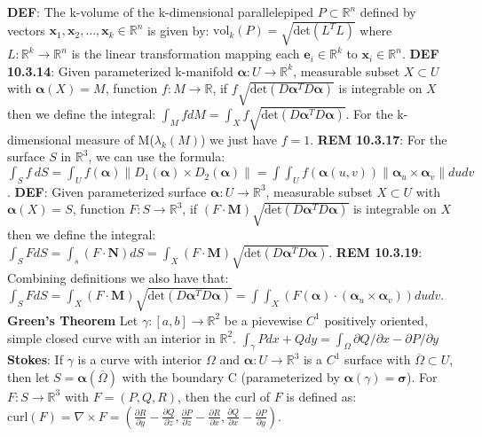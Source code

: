 \documentclass[8pt]{extarticle}
\theoremstyle{definition}
\begin{document}
\textbf{DEF}: The k-volume of the k-dimensional parallelepiped $P \subset \mathbb{R}^n$ defined by vectors $\textbf{x}_1, \textbf{x}_2, \dots, \textbf{x}_k \in \mathbb{R}^n$ is given by: $\text{vol}_k(P) = \sqrt{\text{det}(L^T L)}$ where $L:\mathbb{R}^k \rightarrow \mathbb{R}^n$ is the linear transformation mapping each $\textbf{e}_i \in \mathbb{R}^k$ to $\textbf{x}_i \in \mathbb{R}^n$. 
\textbf{DEF 10.3.14}: Given parameterized k-manifold $\bm{\alpha}: U \rightarrow \mathbb{R}^k$, measurable subset $X \subset U$ with $\bm{\alpha}(X) = M$, function $f: M \rightarrow \mathbb{R}$, if $f\sqrt{\text{det}(D \bm{\alpha}^{T} D \bm{\alpha})}$ is integrable on $X$ then we define the integral: $\int_M f dM = \int_X f\sqrt{\text{det}(D \bm{\alpha}^{T} D \bm{\alpha})}$. For the k-dimensional measure of M($\lambda_k(M)$) we just have $f = 1$. 
\textbf{REM 10.3.17}: For the surface $S$ in $\mathbb{R}^3$, we can use the formula: $\int_S f~dS = \int_U f(\bm{\alpha}) \| D_1(\bm{\alpha}) \times D_2(\bm{\alpha}) \| = \int \int_U f(\bm{\alpha}(u,v)) \| \bm{\alpha}_u \times \bm{\alpha}_v \| dudv$. 
\textbf{DEF}: Given parameterized surface $\bm{\alpha}: U \rightarrow \mathbb{R}^3$, measurable subset $X \subset U$ with $\bm{\alpha}(X) = S$, function $F: S \rightarrow \mathbb{R}^3$, if $(F\cdot \textbf{M})\sqrt{\text{det}(D \bm{\alpha}^{T} D \bm{\alpha})}$ is integrable on $X$ then we define the integral: $\int_S F dS = \int_s (F \cdot \textbf{N}) dS = \int_X (F\cdot \textbf{M})\sqrt{\text{det}(D \bm{\alpha}^{T} D \bm{\alpha})}$. 
\textbf{REM 10.3.19}: Combining definitions we also have that: $\int_S F dS = \int_X (F\cdot \textbf{M})\sqrt{\text{det}(D \bm{\alpha}^{T} D \bm{\alpha})} = \int \int_X (F(\bm{\alpha}) \cdot (\bm{\alpha}_u \times \bm{\alpha}_v)) dudv$. 
\textbf{Green's Theorem} Let $\gamma:[a,b] \to \mathbb{R}^2 $ be a pievewise $C^1$ positively oriented, simple closed curve with an interior in $\mathbb{R}^2$. $\int_\gamma Pdx + Qdy = \int_\Omega \partial Q/ \partial x - \partial P/\partial y$
\textbf{Stokes}: If $\gamma$ is a curve with interior $\Omega$ and $\bm{\alpha}: U \rightarrow \mathbb{R}^3$ is a $C^1$ surface with $\overline \Omega \subset U$, then let $S = \bm{\alpha}(\overline \Omega)$ with the boundary C (parameterized by $\bm{\alpha}(\gamma) = \bm{\sigma}$). For $F: S \rightarrow \mathbb{R}^3$ with $F = (P,Q,R)$, then the curl of $F$ is defined as: $\text{curl}(F) = \nabla \times F = \left( \frac{\partial R}{\partial y} - \frac{\partial Q}{\partial z}, \frac{\partial P}{\partial z} - \frac{\partial R}{\partial x}, \frac{\partial Q}{\partial x} - \frac{\partial P}{\partial y} \right)$. 
\end{document}
